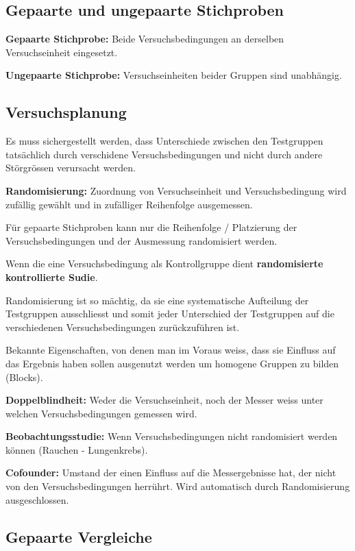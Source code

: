 \documentclass[8pt,a4paper]{scrartcl}
\begin{document}
\begin{multicols*}{3}
\subsection{Gepaarte und ungepaarte Stichproben}

\textbf{Gepaarte Stichprobe:} Beide Versuchsbedingungen an derselben Versuchseinheit eingesetzt.

\textbf{Ungepaarte Stichprobe:} Versuchseinheiten beider Gruppen sind unabhängig.

\subsection{Versuchsplanung}

Es muss sichergestellt werden, dass Unterschiede zwischen den Testgruppen tatsächlich durch verschidene Versuchsbedingungen und nicht durch andere Störgrössen verursacht werden.

\textbf{Randomisierung:} Zuordnung von Versuchseinheit und Versuchsbedingung wird zufällig gewählt und in zufälliger Reihenfolge ausgemessen.

Für gepaarte Stichproben kann nur die Reihenfolge / Platzierung der Versuchsbedingungen und der Ausmessung randomisiert werden.

Wenn die eine Versuchsbedingung als Kontrollgruppe dient \dahe \textbf{randomisierte kontrollierte Sudie}.

Randomisierung ist so mächtig, da sie eine systematische Aufteilung der Testgruppen ausschliesst und somit jeder Unterschied der Testgruppen auf die verschiedenen Versuchsbedingungen zurückzuführen ist.

Bekannte Eigenschaften, von denen man im Voraus weiss, dass sie Einfluss auf das Ergebnis haben sollen ausgenutzt werden um homogene Gruppen zu bilden (Blocks).


\textbf{Doppelblindheit:} Weder die Versuchseinheit, noch der Messer weiss unter welchen Versuchsbedingungen gemessen wird.

\textbf{Beobachtungsstudie:} Wenn Versuchsbedingungen nicht randomisiert werden können (Rauchen - Lungenkrebs).

\textbf{Cofounder:} Umstand der einen Einfluss auf die Messergebnisse hat, der nicht von den Versuchsbedingungen herrührt. Wird automatisch durch Randomisierung ausgeschlossen.

\subsection{Gepaarte Vergleiche}


\end{multicols*}
\end{document}
